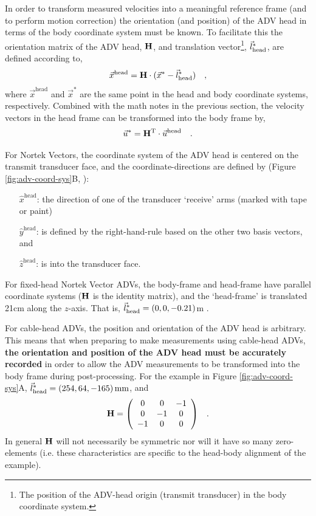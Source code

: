 \documentclass[twocol]{ametsoc}
\begin{document}
In order to transform measured velocities into a meaningful reference frame (and to perform motion correction) the orientation (and position) of the ADV head in terms of the body coordinate system must be known. To facilitate this the orientation matrix of the ADV head, $\mathbf{H}$, and translation vector\footnote{The position of the ADV-head origin (transmit transducer) in the body coordinate system.}, $\vec{l}_\mathrm{head}^*$, are defined according to,
\begin{align}
  \label{eqn:coord_sys}
  \vec{x}^\mathrm{head} &= \mathbf{H} \cdot (\vec{x}^* - \vec{l}_\mathrm{head}^*) & ,
\end{align}
where $\vec{x}^\mathrm{head}$ and $\vec{x}^*$ are the same point in the head and body coordinate systems, respectively. Combined with the math notes in the previous section, the velocity vectors in the head frame can be transformed into the body frame by,
\begin{align}
  \label{eqn:coord_sys2}
  \vec{u}^* &=  \mathbf{H}^\mathrm{T} \cdot \vec{u}^\mathrm{head} & .
\end{align}

For Nortek Vectors, the coordinate system of the ADV head is centered on the transmit transducer face, and the coordinate-directions are defined by (Figure \ref{fig:adv-coord-sys}B, \cite{vector_manual2005}):
\begin{itemize}
\item[$\hat{x}^\mathrm{head}$:] the direction of one of the transducer `receive' arms (marked with tape or paint)
\item[$\hat{y}^\mathrm{head}$:] is defined by the right-hand-rule based on the other two basis vectors, and
\item[$\hat{z}^\mathrm{head}$:] is into the transducer face.
\end{itemize}

For fixed-head Nortek Vector ADVs, the body-frame and head-frame have parallel coordinate systems ($\mathbf{H}$ is the identity matrix), and the `head-frame' is translated 21cm along the $z$-axis.  That is, $\vec{l}_\mathrm{head}^* = (0, 0, -0.21)$m \cite[]{vector_manual2005}.  

For cable-head ADVs, the position and orientation of the ADV head is arbitrary.  This means that when preparing to make measurements using cable-head ADVs, {\bf the orientation and position of the ADV head must be accurately recorded} in order to allow the ADV measurements to be transformed into the body frame during post-processing. For the example in Figure \ref{fig:adv-coord-sys}A, $\vec{l}_\mathrm{head}^* = (254,64,-165)\,\mathrm{mm}$, and
\begin{align*}
  \mathbf{H} &= \left (
    \begin{array}{ccc}
      0 & 0 & -1 \\
      0 & -1 & 0 \\
      -1 & 0 & 0
    \end{array}
    \right ) & .
\end{align*}
In general $\mathbf{H}$ will not necessarily be symmetric nor will it have so many zero-elements (i.e. these characteristics are specific to the head-body alignment of the example).
\end{document}
